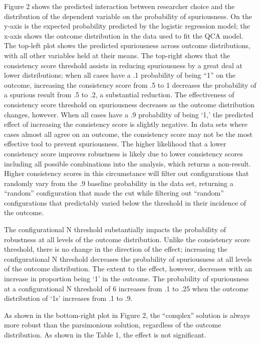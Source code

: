 \documentclass[]{article}
\begin{document}
{Figure 2 shows the predicted interaction between researcher choice and the distribution of the dependent variable on the probability of spuriousness. On the y-axis is the expected probability predicted by the logistic regression model; the x-axis shows the outcome distribution in the data used to fit the QCA model. The top-left plot shows the predicted spuriousness across outcome distributions, with all other variables held at their means. The top-right shows that the consistency score threshold assists in reducing spuriousness by a great deal at lower distributions; when all cases have a .1 probability of being ``1'' on the outcome, increasing the consistency score from .5 to 1 decreases the probability of a spurious result from .5 to .2, a substantial reduction. The effectiveness of consistency score threshold on spuriousness decreases as the outcome distribution changes, however. When all cases have a .9 probability of being `1,' the predicted effect of increasing the consistency score is slightly negative. In data sets where cases almost all agree on an outcome, the consistency score may not be the most effective tool to prevent spuriousness. The higher likelihood that a lower consistency score improves robustness is likely due to lower consistency scores including all possible combinations into the analysis, which returns a non-result. Higher consistency scores in this circumstance will filter out configurations that randomly vary from the .9 baseline probability in the data set, returning a ``random'' configuration that made the cut while filtering out ``random'' configurations that predictably varied below the threshold in their incidence of the outcome.

The configurational N threshold substantially impacts the probability of robustness at all levels of the outcome distribution. Unlike the consistency score threshold, there is no change in the direction of the effect; increasing the configurational N threshold decreases the probability of spuriousness at all levels of the outcome distribution. The extent to the effect, however, decreases with an increase in proportion being `1' in the outcome. The probability of spuriousness at a configurational N threshold of 6 increases from .1 to .25 when the outcome distribution of `1s' increases from .1 to .9. 

As shown in the bottom-right plot in Figure 2, the ``complex'' solution is always more robust than the parsimonious solution, regardless of the outcome distribution. As shown in the Table 1, the effect is not significant. 

}
\end{document}
